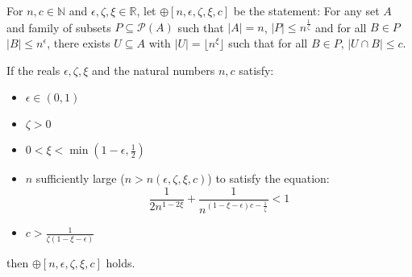     \label{n_large_enough_property}
    For $n, c \in \mathbb{N}$ and $\epsilon, \zeta, \xi \in \mathbb{R}$, let $\oplus[n, \epsilon, \zeta, \xi, c]$ be
    the statement:
    For any set $A$ and family of subsets $P \subseteq \mathcal{P}(A)$ such that $|A| = n$, $|P| \leq n^{\frac{1}{\zeta}}$ and for all
    $B \in P$ $|B| \leq n^\epsilon$, there exists $U \subseteq A$ with $|U| = \lfloor n^\xi \rfloor$ such that
    for all $B \in P$, $|U \cap B| \leq c$.

    \lemma[Lemma 4.19]\label{n_large_enough_valid_values}
        If the reals $\epsilon, \zeta, \xi$ and the natural numbers $n, c$ satisfy:
        \begin{itemize}
            \item $\epsilon \in (0,1)$
            \item $\zeta > 0$
            \item $0 < \xi < \min(1-\epsilon, \frac{1}{2})$
            \item $n$ sufficiently large ($n > n(\epsilon, \zeta, \xi, c)$) to satisfy the equation:
            \[
                \frac{1}{2n^{1-2\xi}} + \frac{1}{n^{(1 - \xi - \epsilon)c - \frac{1}{\zeta}}} < 1
            \]
            \item $c > \frac{1}{\zeta (1 - \xi - \epsilon)}$
        \end{itemize}
        then $\oplus[n, \epsilon, \zeta, \xi, c]$ holds.
